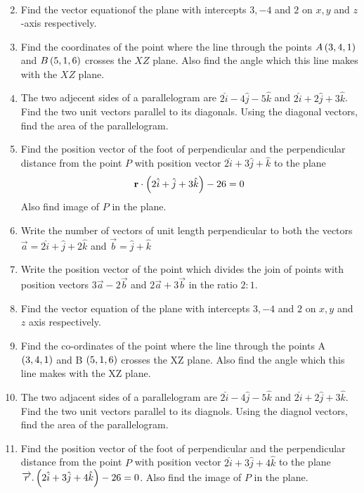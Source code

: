 \begin{enumerate}
\begin{align*}
          \end{align*}
    \item Find the vector equationof the plane with intercepts $3,-4$ and $2$ on $x,y$ and  $z$-axis respectively.
    \item Find the coordinates of the point where the line through the points $A\left(3,4,1\right)$ and $B\left(5,1,6\right)$ crosses the $XZ$ plane. Also find the angle which this line makes with the $XZ$ plane.
    \item The two adjecent sides of a parallelogram are $2\hat{i}-4\hat{j}-5\hat{k}$ and $2\hat{i}+2\hat{j}+3\hat{k}$. Find the two unit vectors parallel to its diagonals. Using the diagonal vectors, find the area of the parallelogram.
    \item Find the position vector of the foot of perpendicular and the perpendicular distance from the point $P$ with position vector $2\hat{i}+3\hat{j}+\hat{k}$ to the plane
          \begin{align*}
              \mathbf{r}\cdot\left(2\hat{i}+\hat{j}+3\hat{k}\right) - 26=0
          \end{align*}
          Also find image of $P$ in the plane.
	\item Write the number of vectors of unit length perpendicular to both the vectors $\overrightarrow{a} = 2\hat{i}+\hat{j} + 2\hat{k}$ and $\overrightarrow{b} = \hat{j} + \hat{k}$
	\item Write the position vector of the point which divides the join of points with position vectors $3\overrightarrow{a} - 2\overrightarrow{b}$ and $2\overrightarrow{a} + 3\overrightarrow{b}$ in the ratio $2:1$.
	\item Find the vector equation of the plane  with intercepts $3, -4$ and $2$ on $x, y$ and $z$ axis respectively.
	\item Find the co-ordinates of the point where the line through the points A $\left(3,4,1\right) $ and B $\left(5,1,6\right)$ crosses the XZ plane. Also find the angle which this line makes with the XZ plane.
	\item The two adjacent sides of a parallelogram  are $2\hat{i} -4\hat{j} -5\hat{k}$ and $2\hat{i} +2\hat{j} +3\hat{k}$. Find the two unit vectors parallel to its diagnols. Using the diagnol vectors, find the area of the parallelogram.
	\item Find the position vector of the foot of perpendicular and the perpendicular distance from the point $P$ with position vector $2\hat{i} +3\hat{j} + 4\hat{k}$ to the plane $\overrightarrow{r}.\left(2\hat{i} + 3\hat{j} + 4\hat{k}\right) - 26 = 0 $. Also find the image of $P$ in the plane.

\end{enumerate}
